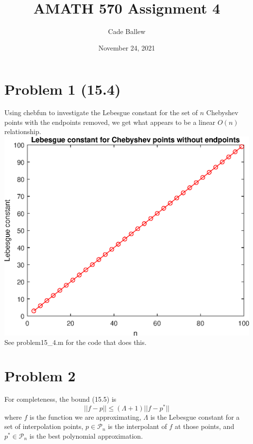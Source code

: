 \documentclass{article}
\title{AMATH 570 Assignment 4}
\author{Cade Ballew}
\date{November 24, 2021}
\begin{document}
\maketitle

\section{Problem 1 (15.4)}
Using chebfun to investigate the Lebesgue constant for the set of $n$ Chebyshev points with the endpoints removed, we get what appears to be a linear $O(n)$ relationship.\\
\includegraphics[]{15-4.eps}\\
See problem15\_4.m for the code that does this. 
\section{Problem 2} 
For completeness, the bound (15.5) is 
\[
||f-p||\leq(\Lambda+1)||f-p^{*}||
\]
where $f$ is the function we are approximating, $\Lambda$ is the Lebesgue constant for a set of interpolation points, $p\in\mathcal{P}_n$ is the interpolant of $f$ at those points, and $p^*\in\mathcal{P}_n$ is the best polynomial approximation.
\end{document}
